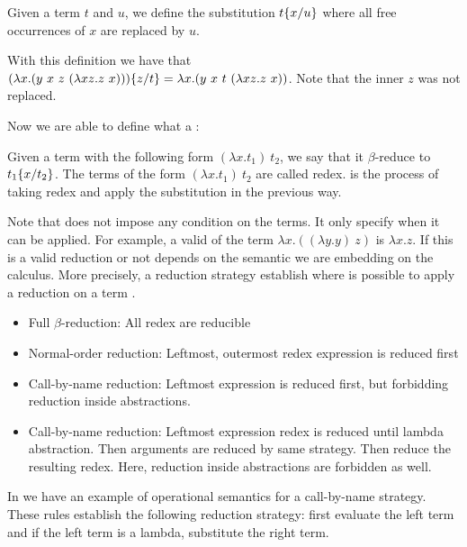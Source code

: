 \begin{Definition}[Substitution]
\label{def:untypedSubst}
Given a term $t$ and $u$, we define the substitution $\untypedSubst{t}{u}{x}$ where all free occurrences of $x$ are
replaced by $u$.
\end{Definition}
With this definition we have that 
$\untypedSubst{(\lambda x.(y\ x\ z\ (\lambda xz.z\ x)))}{t}{z} = \lambda x.(y\ x\ t\ (\lambda xz.z\ x))$.
Note that the 
inner $z$ was not replaced.

Now we are able to define what a \betaRed{}:
\begin{Definition}
\def\tl{$(\lambda x.t_1)\ t_2$}
\def\ts{$\untypedSubst{t_1}{t_2}{x}$}
Given a term with the following form \tl{}, we say that it $\beta$-reduce to \ts{}. The terms of the form
\tl{} are called redex.
\betaRed{} is the process of taking redex and apply the substitution in the previous way.
\end{Definition}

Note that \betaRed{} does not impose any condition on the terms. It only specify when it can be applied.
For example, a valid \betaRed{} of the term $\lambda x.((\lambda y. y)\ z)$ is $\lambda x.z$. 
If this is a valid reduction or not depends on the semantic we are embedding on the calculus. More precisely,
a reduction strategy establish where is possible to apply a reduction on a term \cite{Tapl:2002}.
\begin{itemize}
    \item Full $\beta$-reduction: All redex are reducible
    \item Normal-order reduction: Leftmost, outermost redex expression is reduced first
    \item Call-by-name reduction: Leftmost expression is reduced first, but forbidding reduction inside 
          abstractions.
    \item Call-by-name reduction: Leftmost expression redex is reduced until lambda abstraction. Then arguments
          are reduced by same strategy. Then reduce the resulting redex. Here, reduction inside abstractions are
          forbidden as well.
\end{itemize}

In  we have an example of operational semantics for a call-by-name strategy.
These rules establish the following reduction strategy:
first evaluate the left term and if the left term is a lambda,
substitute the right term.

